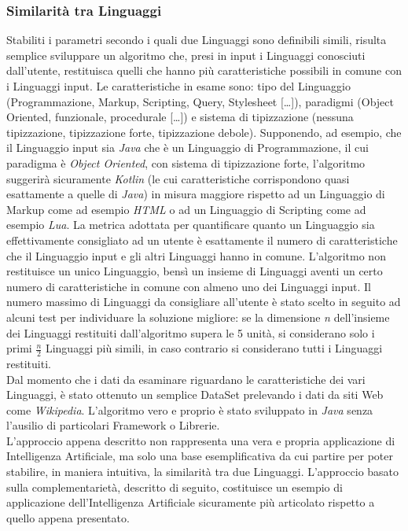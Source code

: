 \subsubsection{Similarità tra Linguaggi}
Stabiliti i parametri secondo i quali due Linguaggi sono definibili simili, risulta semplice sviluppare un algoritmo che, presi in input i Linguaggi conosciuti dall'utente, restituisca quelli che hanno più caratteristiche possibili in comune con i Linguaggi input. Le caratteristiche in esame sono: tipo del Linguaggio (Programmazione, Markup, Scripting, Query, Stylesheet [\dots]), paradigmi (Object Oriented, funzionale, procedurale [\dots]) e sistema di tipizzazione (nessuna tipizzazione, tipizzazione forte, tipizzazione debole). 
Supponendo, ad esempio, che il Linguaggio input sia \emph{Java} che è un Linguaggio di Programmazione, il cui paradigma è \emph{Object Oriented}, con sistema di tipizzazione forte, l'algoritmo suggerirà sicuramente \emph{Kotlin} (le cui caratteristiche corrispondono quasi esattamente a quelle di \emph{Java}) in misura maggiore rispetto ad un Linguaggio di Markup come ad esempio \emph{HTML} o ad un Linguaggio di Scripting come ad esempio \emph{Lua}. 
La metrica adottata per quantificare quanto un Linguaggio sia effettivamente consigliato ad un utente è esattamente il numero di caratteristiche che il Linguaggio input e gli altri Linguaggi hanno in comune. 
L'algoritmo non restituisce un unico Linguaggio, bensì un insieme di Linguaggi aventi un certo numero di caratteristiche in comune con almeno uno dei Linguaggi input. Il numero massimo di Linguaggi da consigliare all'utente è stato scelto in seguito ad alcuni test per individuare la soluzione migliore: se la dimensione \emph{n} dell'insieme dei Linguaggi restituiti dall'algoritmo supera le 5 unità, si considerano solo i primi \(\frac{n}{2}\) Linguaggi più simili, in caso contrario si considerano tutti i Linguaggi restituiti. \\
Dal momento che i dati da esaminare riguardano le caratteristiche dei vari Linguaggi, è stato ottenuto un semplice DataSet prelevando i dati da siti Web come \emph{Wikipedia}. L'algoritmo vero e proprio è stato sviluppato in \emph{Java} senza l'ausilio di particolari Framework o Librerie. \\
L'approccio appena descritto non rappresenta una vera e propria applicazione di Intelligenza Artificiale, ma solo una base esemplificativa da cui partire per poter stabilire, in maniera intuitiva, la similarità tra due Linguaggi. L'approccio basato sulla complementarietà, descritto di seguito, costituisce un esempio di applicazione dell'Intelligenza Artificiale sicuramente più articolato rispetto a quello appena presentato.

